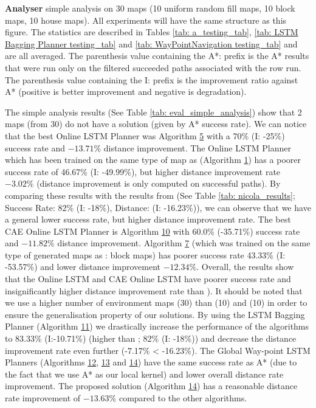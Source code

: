 \begin{table}[]
\caption{\textbf{Analyser} simple analysis on 30 maps (10 uniform random fill maps, 10 block maps, 10 house maps). All experiments will have the same structure as this figure. The statistics are described in Tables \ref{tab: a_testing_tab}, \ref{tab: LSTM Bagging Planner testing_tab} and \ref{tab: WayPointNavigation testing_tab} and are all averaged. The parenthesis value containing the A*: prefix is the A* results that were run only on the filtered succeeded paths associated with the row run. The parenthesis value containing the I: prefix is the improvement ratio against A* (positive is better improvement and negative is degradation).}
\label{tab: eval_simple_analysis} 
\end{table}

The simple analysis results (See Table \ref{tab: eval_simple_analysis}) show that 2 maps (from 30) do not have a solution (given by A* success rate). We can notice that the best Online LSTM Planner was Algorithm \hyperref[tab: evalalgorithms]{5} with a 70\% (I: -25\%) success rate and $-13.71\%$ distance improvement. The Online LSTM Planner which has been trained on the same type of map as \cite{nicola2018lstm} (Algorithm \hyperref[tab: evalalgorithms]{1}) has a poorer success rate of 46.67\% (I: -49.99\%), but higher distance improvement rate $-3.02\%$ (distance improvement is only computed on successful paths). By comparing these results with the results from \cite{nicola2018lstm} (See Table \ref{tab: nicola_results}; Success Rate: 82\% (I: -18\%), Distance: (I: -16.23\%)), we can observe that we have a general lower success rate, but higher distance improvement rate. The best CAE Online LSTM Planner is Algorithm \hyperref[tab: evalalgorithms]{10} with 60.0\% (-35.71\%) success rate and $-11.82\%$ distance improvement. Algorithm \hyperref[tab: evalalgorithms]{7} (which was trained on the same type of generated maps as \cite{inoue2019robot}: block maps) has poorer success rate 43.33\% (I: -53.57\%) and lower distance improvement $-12.34\%$. Overall, the results show that the Online LSTM and CAE Online LSTM have poorer success rate and insignificantly higher distance improvement rate than \cite{nicola2018lstm}). It should be noted that we use a higher number of environment maps (30) than \cite{nicola2018lstm} (10) and \cite{inoue2019robot} (10) in order to ensure the generalisation property of our solutions. By using the LSTM Bagging Planner (Algorithm \hyperref[tab: evalalgorithms]{11}) we drastically increase the performance of the algorithms to 83.33\% (I:-10.71\%) (higher than \cite{nicola2018lstm}; 82\% (I: -18\%)) and decrease the distance improvement rate even further (-7.17\% < -16.23\%). The Global Way-point LSTM Planners (Algorithms \hyperref[tab: evalalgorithms]{12}, \hyperref[tab: evalalgorithms]{13} and \hyperref[tab: evalalgorithms]{14}) have the same success rate as A* (due to the fact that we use A* as our local kernel) and lower overall distance rate improvement. The proposed solution (Algorithm \hyperref[tab: evalalgorithms]{14}) has a reasonable distance rate improvement of $-13.63\%$ compared to the other algorithms.

